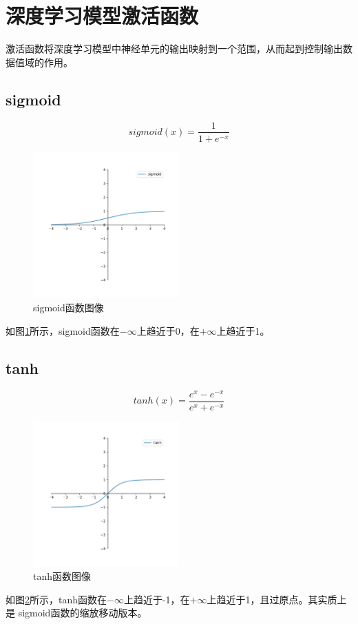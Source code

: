 \documentclass[AutoFakeBold]{LZUThesis}
\begin{document}
\section{深度学习模型激活函数}
激活函数将深度学习模型中神经单元的输出映射到一个范围，从而起到控制输出数据值域的作用。
\subsection{sigmoid}
$$sigmoid(x)=\frac{1}{1+e^{-x}}$$
\begin{figure}[H]
	\centering
    \includegraphics[width=0.5\textwidth]{figures/sigmoid.pdf}
    \caption{sigmoid函数图像}
    \label{fig_sigmoid}
\end{figure}
如图\ref{fig_sigmoid}所示，sigmoid函数在$-\infty$上趋近于0，在$+\infty$上趋近于1。

\subsection{tanh}
$$tanh(x) = \frac{e^x-e^{-x}}{e^x+e^{-x}}$$
\begin{figure}[H]
	\centering
    \includegraphics[width=0.5\textwidth]{figures/tanh.pdf}
    \caption{tanh函数图像}
    \label{fig_tanh}
\end{figure}
如图\ref{fig_tanh}所示，tanh函数在$-\infty$上趋近于-1，在$+\infty$上趋近于1，且过原点。其实质上是
sigmoid函数的缩放移动版本。
\end{document}
